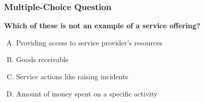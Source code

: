 \documentclass[aspectratio=169, table]{beamer}
\begin{document}
\begin{frame}
	\frametitle{Multiple-Choice Question}
	\textbf{Which of these is not an example of a service offering?}
	\begin{enumerate}[A.]
		\item Providing access to service provider’s resources
		\item Goods receivable
		\item Service actions like raising incidents
		\item Amount of money spent on a specific activity
	\end{enumerate}
\end{frame}
\end{document}
